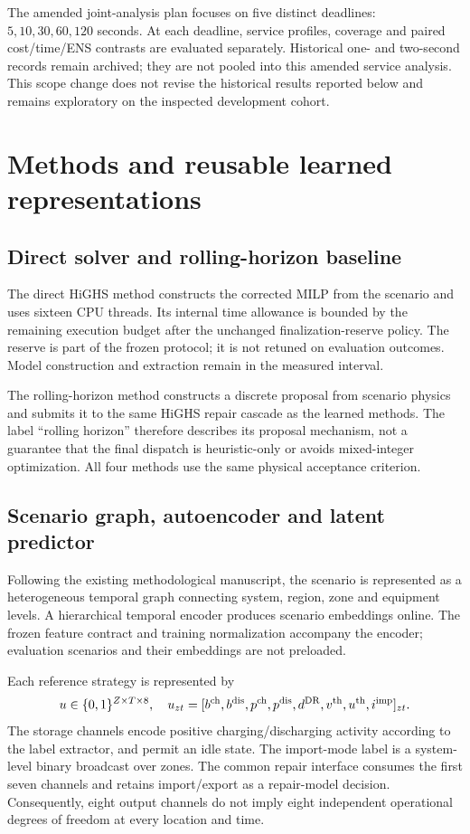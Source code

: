 The amended joint-analysis plan focuses on five distinct deadlines:
$5,10,30,60,120$ seconds. At each deadline, service profiles, coverage and
paired cost/time/ENS contrasts are evaluated separately. Historical one- and
two-second records remain archived; they are not pooled into this amended
service analysis. This scope change does not revise the historical results
reported below and remains exploratory on the inspected development cohort.

\section{Methods and reusable learned representations}
\subsection{Direct solver and rolling-horizon baseline}
The direct HiGHS method constructs the corrected MILP from the scenario and
uses sixteen CPU threads. Its internal time allowance is bounded by the
remaining execution budget after the unchanged finalization-reserve policy.
The reserve is part of the frozen protocol; it is not retuned on evaluation
outcomes. Model construction and extraction remain in the measured interval.

The rolling-horizon method constructs a discrete proposal from scenario physics
and submits it to the same HiGHS repair cascade as the learned methods. The
label ``rolling horizon'' therefore describes its proposal mechanism, not a
guarantee that the final dispatch is heuristic-only or avoids mixed-integer
optimization. All four methods use the same physical acceptance criterion.

\subsection{Scenario graph, autoencoder and latent predictor}
Following the existing methodological manuscript, the scenario is represented
as a heterogeneous temporal graph connecting system, region, zone and equipment
levels. A hierarchical temporal encoder produces scenario embeddings online.
The frozen feature contract and training normalization accompany the encoder;
evaluation scenarios and their embeddings are not preloaded.

Each reference strategy is represented by
\begin{equation}
 u\in\{0,1\}^{Z\times T\times8},\quad
 u_{zt}=[b^{\rm ch},b^{\rm dis},p^{\rm ch},p^{\rm dis},d^{\rm DR},v^{\rm th},u^{\rm th},i^{\rm imp}]_{zt}.
\end{equation}
The storage channels encode positive charging/discharging activity according
to the label extractor, and permit an idle state. The import-mode label is a
system-level binary broadcast over zones. The common repair interface consumes
the first seven channels and retains import/export as a repair-model decision.
Consequently, eight output channels do not imply eight independent operational
degrees of freedom at every location and time.

